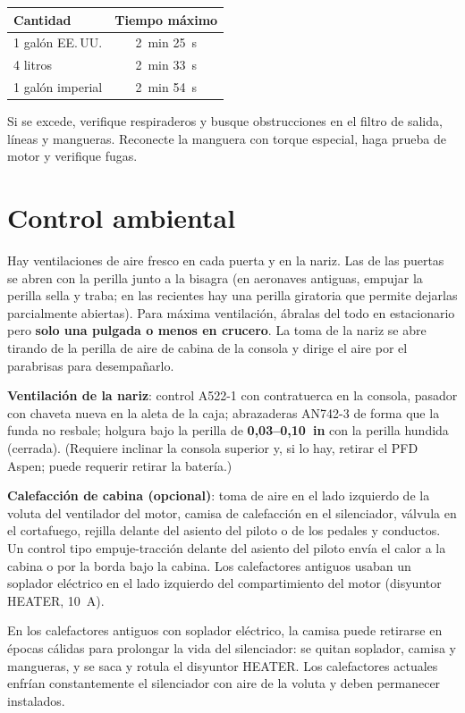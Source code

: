 \begin{center}
\begin{tabular}{lc}
\toprule
Cantidad & Tiempo máximo \\
\midrule
1 galón EE.\,UU. & 2~min 25~s \\
4 litros & 2~min 33~s \\
1 galón imperial & 2~min 54~s \\
\bottomrule
\end{tabular}
\end{center}

Si se excede, verifique respiraderos y busque obstrucciones en el filtro de salida, líneas y mangueras. Reconecte la manguera con torque especial, haga prueba de motor y verifique fugas.

\section{Control ambiental}

Hay ventilaciones de aire fresco en cada puerta y en la nariz. Las de las puertas se abren con la perilla junto a la bisagra (en aeronaves antiguas, empujar la perilla sella y traba; en las recientes hay una perilla giratoria que permite dejarlas parcialmente abiertas). Para máxima ventilación, ábralas del todo en estacionario pero \textbf{solo una pulgada o menos en crucero}. La toma de la nariz se abre tirando de la perilla de aire de cabina de la consola y dirige el aire por el parabrisas para desempañarlo.

\textbf{Ventilación de la nariz}: control A522-1 con contratuerca en la consola, pasador con chaveta nueva en la aleta de la caja; abrazaderas AN742-3 de forma que la funda no resbale; holgura bajo la perilla de \textbf{0,03--0,10~in} con la perilla hundida (cerrada). (Requiere inclinar la consola superior y, si lo hay, retirar el PFD Aspen; puede requerir retirar la batería.)

\textbf{Calefacción de cabina (opcional)}: toma de aire en el lado izquierdo de la voluta del ventilador del motor, camisa de calefacción en el silenciador, válvula en el cortafuego, rejilla delante del asiento del piloto o de los pedales y conductos. Un control tipo empuje-tracción delante del asiento del piloto envía el calor a la cabina o por la borda bajo la cabina. Los calefactores antiguos usaban un soplador eléctrico en el lado izquierdo del compartimiento del motor (disyuntor HEATER, 10~A).

\begin{nota}
En los calefactores antiguos con soplador eléctrico, la camisa puede retirarse en épocas cálidas para prolongar la vida del silenciador: se quitan soplador, camisa y mangueras, y se saca y rotula el disyuntor HEATER. Los calefactores actuales enfrían constantemente el silenciador con aire de la voluta y deben permanecer instalados.
\end{nota}
